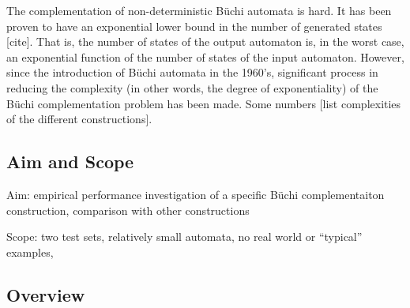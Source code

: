 The complementation of non-deterministic Büchi automata is hard. It has been proven to have an exponential lower bound in the number of generated states [cite]. That is, the number of states of the output automaton is, in the worst case, an exponential function of the number of states of the input automaton. However, since the introduction of Büchi automata in the 1960's, significant process in reducing the complexity (in other words, the degree of exponentiality) of the Büchi complementation problem has been made. Some numbers [list complexities of the different constructions].

\subsection{Aim and Scope}

Aim: empirical performance investigation of a specific Büchi complementaiton construction, comparison with other constructions

Scope: two test sets, relatively small automata, no real world or ``typical'' examples,


\subsection{Overview}


